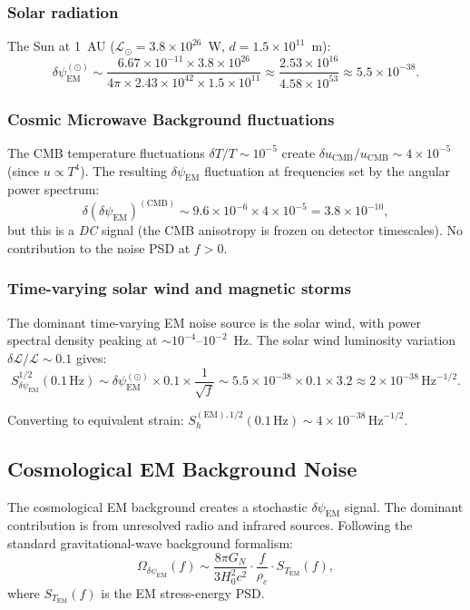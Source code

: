 \documentclass[11pt]{article}
\theoremstyle{definition}
\theoremstyle{remark}
\newcommand{\ee}[1]{\times10^{#1}}
\newcommand{\sqrtHz}{\,\mathrm{Hz}^{-1/2}}
\newcommand{\dpsiem}{\delta\psi_{\mathrm{EM}}}
\newcommand{\GN}{G_N}
\begin{document}
\subsubsection{Solar radiation}
The Sun at 1~AU ($\mathcal{L}_\odot = 3.8\ee{26}$~W, $d = 1.5\ee{11}$~m):
\begin{equation}
\dpsiem^{(\odot)} \sim \frac{6.67\ee{-11} \times 3.8\ee{26}}
{4\pi \times 2.43\ee{42} \times 1.5\ee{11}}
\approx \frac{2.53\ee{16}}{4.58\ee{53}}
\approx 5.5\ee{-38}.
\end{equation}

\subsubsection{Cosmic Microwave Background fluctuations}
The CMB temperature fluctuations $\delta T/T \sim 10^{-5}$ create
$\delta u_{\mathrm{CMB}}/u_{\mathrm{CMB}} \sim 4\times 10^{-5}$
(since $u \propto T^4$). The resulting $\dpsiem$ fluctuation at
frequencies set by the angular power spectrum:
\begin{equation}
\delta(\dpsiem)^{(\mathrm{CMB})} \sim 9.6\ee{-6} \times 4\ee{-5}
= 3.8\ee{-10},
\end{equation}
but this is a \emph{DC} signal (the CMB anisotropy is frozen on
detector timescales). No contribution to the noise PSD at $f > 0$.

\subsubsection{Time-varying solar wind and magnetic storms}
The dominant time-varying EM noise source is the solar wind, with
power spectral density peaking at $\sim 10^{-4}$--$10^{-2}$~Hz.
The solar wind luminosity variation $\delta\mathcal{L}/\mathcal{L}
\sim 0.1$ gives:
\begin{equation}
S_{\dpsiem}^{1/2}(0.1\,\mathrm{Hz}) \sim \dpsiem^{(\odot)} \times 0.1
\times \frac{1}{\sqrt{f}} \sim 5.5\ee{-38} \times 0.1 \times 3.2
\approx 2\ee{-38}\,\mathrm{Hz}^{-1/2}.
\end{equation}

Converting to equivalent strain: $S_h^{(\mathrm{EM}),1/2}(0.1\,\mathrm{Hz})
\sim 4\ee{-38}\sqrtHz$.

\subsection{Cosmological EM Background Noise}

The cosmological EM background creates a stochastic $\dpsiem$ signal.
The dominant contribution is from unresolved radio and infrared sources.
Following the standard gravitational-wave background formalism:
\begin{equation}
\Omega_{\dpsiem}(f) \sim \frac{8\pi\GN}{3H_0^2 c^2} \cdot
\frac{f}{\rho_c} \cdot S_{T_{\mathrm{EM}}}(f),
\end{equation}
where $S_{T_{\mathrm{EM}}}(f)$ is the EM stress-energy PSD.
\end{document}
